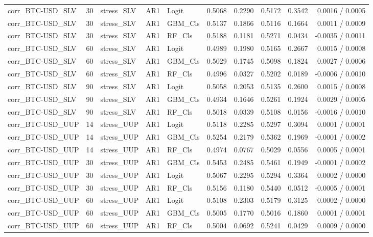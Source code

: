 \begin{table}[H]
\begin{tabular}{lllllrrrrr}
corr_BTC-USD_SLV & 30 & stress_SLV & AR1 & Logit & 0.5068 & 0.2290 & 0.5172 & 0.3542 & 0.0016 / 0.0005 \\
corr_BTC-USD_SLV & 30 & stress_SLV & AR1 & GBM_Cls & 0.5137 & 0.1866 & 0.5116 & 0.1664 & 0.0011 / 0.0009 \\
corr_BTC-USD_SLV & 30 & stress_SLV & AR1 & RF_Cls & 0.5188 & 0.1181 & 0.5271 & 0.0434 & -0.0035 / 0.0011 \\
corr_BTC-USD_SLV & 60 & stress_SLV & AR1 & Logit & 0.4989 & 0.1980 & 0.5165 & 0.2667 & 0.0015 / 0.0008 \\
corr_BTC-USD_SLV & 60 & stress_SLV & AR1 & GBM_Cls & 0.5029 & 0.1745 & 0.5098 & 0.1824 & 0.0027 / 0.0006 \\
corr_BTC-USD_SLV & 60 & stress_SLV & AR1 & RF_Cls & 0.4996 & 0.0327 & 0.5202 & 0.0189 & -0.0006 / 0.0010 \\
corr_BTC-USD_SLV & 90 & stress_SLV & AR1 & Logit & 0.5058 & 0.2053 & 0.5135 & 0.2600 & 0.0015 / 0.0008 \\
corr_BTC-USD_SLV & 90 & stress_SLV & AR1 & GBM_Cls & 0.4934 & 0.1646 & 0.5261 & 0.1924 & 0.0029 / 0.0005 \\
corr_BTC-USD_SLV & 90 & stress_SLV & AR1 & RF_Cls & 0.5018 & 0.0339 & 0.5108 & 0.0156 & -0.0016 / 0.0010 \\
corr_BTC-USD_UUP & 14 & stress_UUP & AR1 & Logit & 0.5118 & 0.2285 & 0.5297 & 0.3094 & 0.0001 / 0.0001 \\
corr_BTC-USD_UUP & 14 & stress_UUP & AR1 & GBM_Cls & 0.5254 & 0.2179 & 0.5362 & 0.1969 & -0.0001 / 0.0002 \\
corr_BTC-USD_UUP & 14 & stress_UUP & AR1 & RF_Cls & 0.4974 & 0.0767 & 0.5029 & 0.0556 & 0.0005 / 0.0001 \\
corr_BTC-USD_UUP & 30 & stress_UUP & AR1 & GBM_Cls & 0.5453 & 0.2485 & 0.5461 & 0.1949 & -0.0001 / 0.0002 \\
corr_BTC-USD_UUP & 30 & stress_UUP & AR1 & Logit & 0.5067 & 0.2295 & 0.5294 & 0.3364 & 0.0002 / 0.0000 \\
corr_BTC-USD_UUP & 30 & stress_UUP & AR1 & RF_Cls & 0.5156 & 0.1180 & 0.5440 & 0.0512 & -0.0005 / 0.0001 \\
corr_BTC-USD_UUP & 60 & stress_UUP & AR1 & Logit & 0.5108 & 0.2303 & 0.5179 & 0.3125 & 0.0002 / 0.0000 \\
corr_BTC-USD_UUP & 60 & stress_UUP & AR1 & GBM_Cls & 0.5005 & 0.1770 & 0.5016 & 0.1860 & 0.0001 / 0.0001 \\
corr_BTC-USD_UUP & 60 & stress_UUP & AR1 & RF_Cls & 0.5004 & 0.0692 & 0.5241 & 0.0429 & 0.0009 / 0.0000 \\

\end{tabular}
\end{table}
